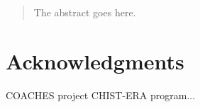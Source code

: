 \documentclass[conference]{IEEEtran}
\begin{document}
\maketitle

\begin{abstract}
The abstract goes here.
\end{abstract}

\IEEEpeerreviewmaketitle











\section*{Acknowledgments}

COACHES project CHIST-ERA program...





\end{document}
